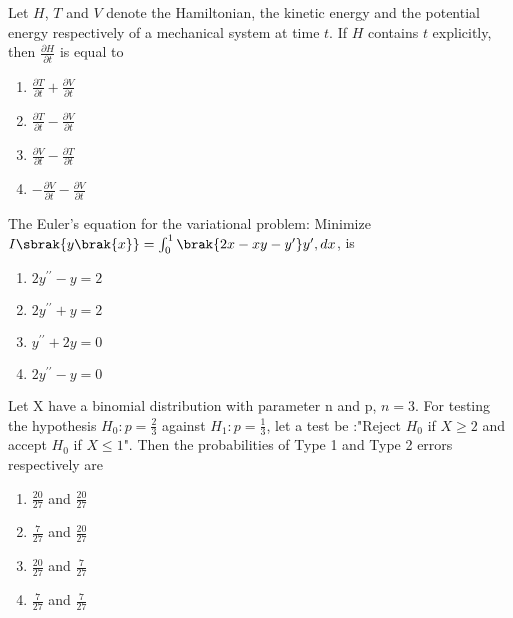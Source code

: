 \item Let $H$, $T$ and $V$ denote the Hamiltonian, the kinetic energy and the potential energy respectively of a mechanical system at time $t$. If $H$ contains $t$ explicitly, then $\frac{\partial H}{\partial t}$ is equal to
\begin{multicols}{2}
    \begin{enumerate}
        \item $\frac{\partial T}{\partial t} + \frac{\partial V}{\partial t}$
        \item $\frac{\partial T}{\partial t} - \frac{\partial V}{\partial t}$
        \item $\frac{\partial V}{\partial t} - \frac{\partial T}{\partial t}$
        \item $-\frac{\partial V}{\partial t} - \frac{\partial V}{\partial t}$
    \end{enumerate}
\end{multicols}

\item The Euler's equation for the variational problem: Minimize \\$I\sbrak{y\brak{x}} = \int_0^1 \brak{2x - xy - y^{\prime}} y^{\prime}, dx$, is 
\begin{multicols}{2}
    \begin{enumerate}
        \item $2y^{{\prime}{\prime}} - y = 2$
        \item $2y^{{\prime}{\prime}} + y = 2$
        \item $y^{{\prime}{\prime}} + 2y = 0$
        \item $2y^{{\prime}{\prime}} - y = 0$
    \end{enumerate}
\end{multicols}
\item Let X have a binomial distribution with parameter n and p, $n=3$. For testing the hypothesis $H_0:p=\frac{2}{3}$ against $H_1:p=\frac{1}{3}$, let a test be :"Reject $H_0$ if $X\geq2$ and accept $H_0$ if $X\leq 1$". Then the probabilities of Type 1 and Type 2 errors respectively are 
\begin{multicols}{2}
    \begin{enumerate}
        \item $\frac{20}{27}$ and $\frac{20}{27}$
        \item $\frac{7}{27}$ and $\frac{20}{27}$
        \item $\frac{20}{27}$ and $\frac{7}{27}$
        \item $\frac{7}{27}$ and $\frac{7}{27}$
    \end{enumerate}
\end{multicols}

